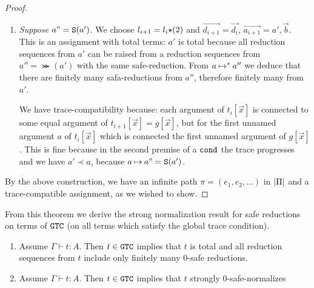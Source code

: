 \begin{proof}
\begin{enumerate}
\begin{enumerate}
\begin{enumerate}
 \item
  \emph{Suppose $a" = {\tt S}(a')$}. 
  We choose $l_{i+1} = l_i {\star} (2)$ and $\vec{d_{i+1}} = \vec{d_i}$,
  $\vec{a_{i+1}} = a',\vec{b}$. This is an assignment with total terms: $a'$ is total because
  all reduction sequences from $a'$ can be raised from a reduction sequences from $a'' = \Succ(a')$
  with the same safe-reduction. From $a \mathbin{\mapsto}^* a''$ we deduce that
  there are finitely many safa-reductions from $a''$, therefore finitely many from $a'$.
 
  We have trace-compatibility because: 
  each argument of $t_i[\vec{x}]$ is connected to some equal argument of 
    $t_{i+1}[\vec{x}]=g[\vec{x}]$,
    but for the first unnamed argument $a$ of $t_i[\vec{x}]$ 
    which is connected the first unnamed argument of $g[\vec{x}]$.
    This is fine because in the second premise of a ${\tt cond}$ 
    the trace progresses and we have $a' \prec a$, because $a \mathbin{\mapsto}  a" = {\tt S}(a')$.

  \end{enumerate}
 \end{enumerate}
\end{enumerate}

By the above construction, we have an infinite path $\pi = (e_1,e_2,\ldots)$ in ${|\Pi|}$
and a trace-compatible assignment, as we wished to show.

  
\end{proof}


From this theorem we derive the strong normalization result for safe reductions on terms of ${\tt GTC}$
(on all terms which satisfy the global trace condition).

\begin{corollary}\label{cor:SN_GTC}
  \begin {enumerate}
  \item
   Assume  $\Gamma\vdash t:A$. Then $t \in {\tt GTC}$ implies that $t$ is total and all reduction sequences
   from $t$ include only finitely many $0$-safe reductions.
  
\item
   Assume  $\Gamma\vdash t:A$. Then $t \in {\tt GTC}$ implies that $t$ strongly $0$-safe-normalizes
   \end{enumerate}
\end{corollary}

